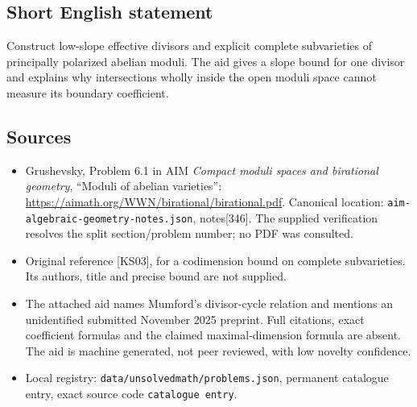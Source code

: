 \documentclass[11pt]{article}
\begin{document}
\subsection{Short English statement}
Construct low-slope effective divisors and explicit complete subvarieties of principally polarized abelian moduli. The aid gives a slope bound for one divisor and explains why intersections wholly inside the open moduli space cannot measure its boundary coefficient.
\subsection{Sources}
\begin{itemize}
\item Grushevsky, Problem 6.1 in AIM \emph{Compact moduli spaces and birational geometry}, ``Moduli of abelian varieties'': \url{https://aimath.org/WWN/birational/birational.pdf}. Canonical location: \texttt{aim-algebraic-geometry-notes.json}, notes[346]. The supplied verification resolves the split section/problem number; no PDF was consulted.
\item Original reference [KS03], for a codimension bound on complete subvarieties. Its authors, title and precise bound are not supplied.
\item The attached aid names Mumford's divisor-cycle relation and mentions an unidentified submitted November 2025 preprint. Full citations, exact coefficient formulas and the claimed maximal-dimension formula are absent. The aid is machine generated, not peer reviewed, with low novelty confidence.
\item Local registry: \texttt{data/unsolvedmath/problems.json}, permanent catalogue entry, exact source code \texttt{catalogue entry}.
\end{itemize}
\end{document}
